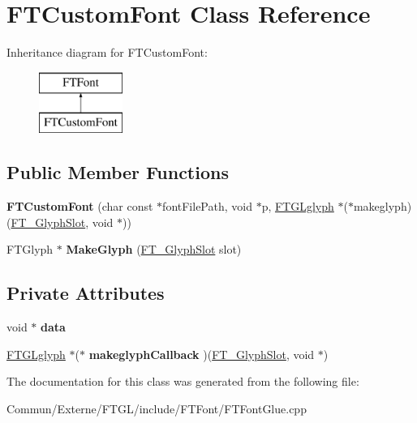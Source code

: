 \hypertarget{class_f_t_custom_font}{}\section{F\+T\+Custom\+Font Class Reference}
\label{class_f_t_custom_font}
Inheritance diagram for F\+T\+Custom\+Font\+:\begin{figure}[H]
\begin{center}
\leavevmode
\includegraphics[height=2.000000cm]{class_f_t_custom_font}
\end{center}
\end{figure}
\subsection*{Public Member Functions}
\begin{DoxyCompactItemize}
\item 
{\bfseries F\+T\+Custom\+Font} (char const $\ast$font\+File\+Path, void $\ast$p, \hyperlink{struct___f_t_g_lglyph}{F\+T\+G\+Lglyph} $\ast$($\ast$makeglyph)(\hyperlink{struct_f_t___glyph_slot_rec__}{F\+T\+\_\+\+Glyph\+Slot}, void $\ast$))\hypertarget{class_f_t_custom_font_a752e3adba12661605536402b55381aa8}{}\label{class_f_t_custom_font_a752e3adba12661605536402b55381aa8}

\item 
F\+T\+Glyph $\ast$ {\bfseries Make\+Glyph} (\hyperlink{struct_f_t___glyph_slot_rec__}{F\+T\+\_\+\+Glyph\+Slot} slot)\hypertarget{class_f_t_custom_font_a14863f6c098d220681087ff85f004dff}{}\label{class_f_t_custom_font_a14863f6c098d220681087ff85f004dff}

\end{DoxyCompactItemize}
\subsection*{Private Attributes}
\begin{DoxyCompactItemize}
\item 
void $\ast$ {\bfseries data}\hypertarget{class_f_t_custom_font_ac8edd1eca7da67f0ef12cd54699ea77f}{}\label{class_f_t_custom_font_ac8edd1eca7da67f0ef12cd54699ea77f}

\item 
\hyperlink{struct___f_t_g_lglyph}{F\+T\+G\+Lglyph} $\ast$($\ast$ {\bfseries makeglyph\+Callback} )(\hyperlink{struct_f_t___glyph_slot_rec__}{F\+T\+\_\+\+Glyph\+Slot}, void $\ast$)\hypertarget{class_f_t_custom_font_a06b6274d8533dca8621eb48f6623163a}{}\label{class_f_t_custom_font_a06b6274d8533dca8621eb48f6623163a}

\end{DoxyCompactItemize}


The documentation for this class was generated from the following file\+:\begin{DoxyCompactItemize}
\item 
Commun/\+Externe/\+F\+T\+G\+L/include/\+F\+T\+Font/F\+T\+Font\+Glue.\+cpp\end{DoxyCompactItemize}
